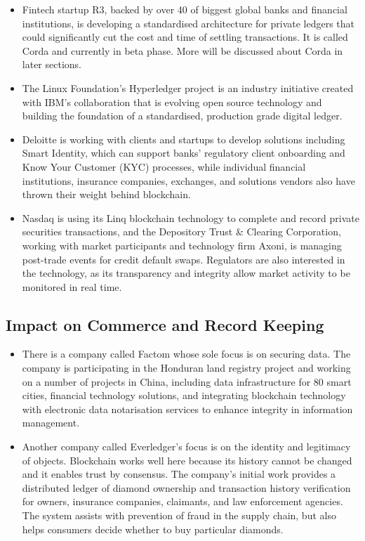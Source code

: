 \begin{itemize}
    \item Fintech startup R3, backed by over 40 of biggest global banks and financial institutions, is developing a standardised architecture for private ledgers that could significantly cut the cost and time of settling transactions\cite{Brown2016Corda:Introduction}. It is called Corda and currently in beta phase. More will be discussed about Corda in later sections.
    \item The Linux Foundation’s Hyperledger project is an industry initiative created with IBM's collaboration that is evolving open source technology and building the foundation of a standardised, production grade digital ledger\cite{IBM2015LinuxTechnology}.
    \item Deloitte is working with clients and startups to develop solutions including Smart Identity, which can support banks’ regulatory client onboarding and Know Your Customer (KYC) processes, while individual financial institutions, insurance companies, exchanges, and solutions vendors also have thrown their weight behind blockchain\cite{Chollet2017DeloitteRelease}.
    \item Nasdaq is using its Linq blockchain technology to complete and record private securities transactions, and the Depository Trust \& Clearing Corporation, working with market participants and technology firm Axoni, is managing post-trade events for credit default swaps. Regulators are also interested in the technology, as its transparency and integrity allow market activity to be monitored in real time\cite{Briganti2015NasdaqBlockchain}. 
\end{itemize}


\subsection{Impact on Commerce and Record Keeping}
\begin{itemize}
    \item There is a company called Factom whose sole focus is on securing data. The company is participating in the Honduran land registry project and working on a number of projects in China, including data infrastructure for 80 smart cities, financial technology solutions, and integrating blockchain technology with electronic data notarisation services to enhance integrity in information management. 
    \item Another company called Everledger’s focus is on the identity and legitimacy of objects. Blockchain works well here because its history cannot be changed and it enables trust by consensus. The company’s initial work provides a distributed ledger of diamond ownership and transaction history verification for owners, insurance companies, claimants, and law enforcement agencies. The system assists with prevention of fraud in the supply chain, but also helps consumers decide whether to buy particular diamonds.
\end{itemize}

